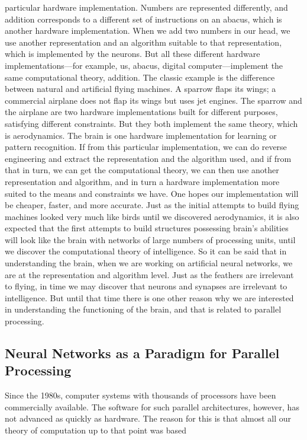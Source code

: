 particular hardware implementation. Numbers are represented differently, and addition corresponds to a different set of instructions on an abacus, which is another hardware implementation. When we add two numbers in our head, we use another representation and an algorithm suitable to that representation, which is implemented by the neurons. But all these different hardware implementations---for example, us, abacus, digital computer---implement the same computational theory, addition. The classic example is the difference between natural and artificial flying machines. A sparrow flaps its wings; a commercial airplane does not flap its wings but uses jet engines. The sparrow and the airplane are two hardware implementations built for different purposes, satisfying different constraints. But they both implement the same theory, which is aerodynamics. The brain is one hardware implementation for learning or pattern recognition. If from this particular implementation, we can do reverse engineering and extract the representation and the algorithm used, and if from that in turn, we can get the computational theory, we can then use another representation and algorithm, and in turn a hardware implementation more suited to the means and constraints we have. One hopes our implementation will be cheaper, faster, and more accurate. Just as the initial attempts to build flying machines looked very much like birds until we discovered aerodynamics, it is also expected that the first attempts to build structures possessing brain’s abilities will look like the brain with networks of large numbers of processing units, until we discover the computational theory of intelligence. So it can be said that in understanding the brain, when we are working on artificial neural networks, we are at the representation and algorithm level. Just as the feathers are irrelevant to flying, in time we may discover that neurons and synapses are irrelevant to intelligence. But until that time there is one other reason why we are interested in understanding the functioning of the brain, and that is related to parallel processing.

\subsection{Neural Networks as a Paradigm for Parallel Processing}

Since the 1980s, computer systems with thousands of processors have been commercially available. The software for such parallel architectures, however, has not advanced as quickly as hardware. The reason for this is that almost all our theory of computation up to that point was based

